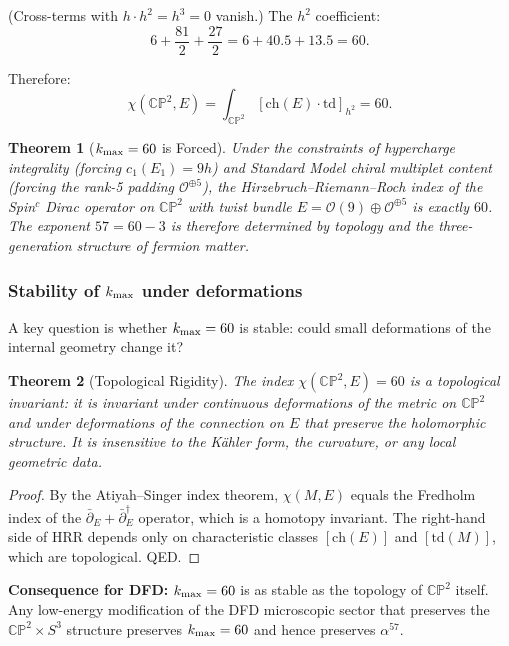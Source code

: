 \documentclass[11pt]{article}
\newtheorem{theorem}{Theorem}[section]
\theoremstyle{definition}
\theoremstyle{remark}
\begin{document}
(Cross-terms with $h\cdot h^2 = h^3 = 0$ vanish.) The $h^2$ coefficient:
\begin{equation}
6 + \frac{81}{2} + \frac{27}{2} = 6 + 40.5 + 13.5 = 60.
\end{equation}

Therefore:
\begin{equation}
\boxed{
\chi(\mathbb{CP}^2, E) = \int_{\mathbb{CP}^2}[\text{ch}(E)\cdot\text{td}]_{h^2}
= 60.
}
\end{equation}

\begin{theorem}[$k_{\rm max} = 60$ is Forced]
\label{thm:kmax}
Under the constraints of hypercharge integrality (forcing $c_1(E_1) = 9h$)
and Standard Model chiral multiplet content (forcing the rank-5 padding
$\mathcal{O}^{\oplus 5}$), the Hirzebruch--Riemann--Roch index of the
Spin$^c$ Dirac operator on $\mathbb{CP}^2$ with twist bundle
$E = \mathcal{O}(9) \oplus \mathcal{O}^{\oplus 5}$ is exactly $60$.
The exponent $57 = 60 - 3$ is therefore determined by topology and
the three-generation structure of fermion matter.
\end{theorem}

\subsubsection{Stability of $k_{\rm max}$ under deformations}

A key question is whether $k_{\rm max} = 60$ is stable: could small deformations
of the internal geometry change it?

\begin{theorem}[Topological Rigidity]
The index $\chi(\mathbb{CP}^2, E) = 60$ is a \emph{topological invariant}:
it is invariant under continuous deformations of the metric on $\mathbb{CP}^2$
and under deformations of the connection on $E$ that preserve the
holomorphic structure. It is insensitive to the K\"{a}hler form, the curvature,
or any local geometric data.
\end{theorem}

\begin{proof}
By the Atiyah--Singer index theorem, $\chi(M, E)$ equals the Fredholm index of
the $\bar\partial_E + \bar\partial_E^\dagger$ operator, which is a homotopy
invariant. The right-hand side of HRR depends only on characteristic classes
$[\text{ch}(E)]$ and $[\text{td}(M)]$, which are topological. QED.
\end{proof}

\textbf{Consequence for DFD:} $k_{\rm max} = 60$ is as stable as the topology
of $\mathbb{CP}^2$ itself. Any low-energy modification of the DFD microscopic
sector that preserves the $\mathbb{CP}^2 \times S^3$ structure preserves
$k_{\rm max} = 60$ and hence preserves $\alpha^{57}$.
\end{document}
